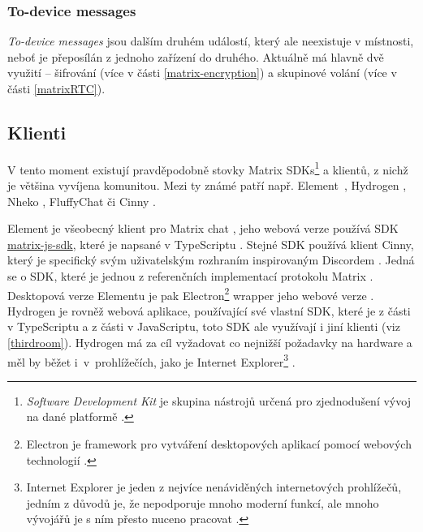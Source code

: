 \subsubsection{To-device messages}\label{toDeviceMessages}

\textit{To-device messages} jsou dalším druhém událostí, který ale neexistuje v
místnosti, neboť je přeposílán z jednoho zařízení do druhého. Aktuálně má hlavně
dvě využití -- šifrování (více v části \ref{matrix-encryption}) a skupinové
volání (více v části \ref{matrixRTC}).

\subsection{Klienti}

V tento moment existují pravděpodobně stovky Matrix SDKs\footnote{
    \textit{Software Development Kit} je skupina nástrojů určená pro zjednodušení
    vývoj na dané platformě \cite{RedHat-WhatIsAnSDK}.
} a klientů, z nichž je většina vyvíjena komunitou. Mezi ty známé patří např.
Element~\cite{Element-Homepage}, Hydrogen \cite{GitHub-Hydrogen}, Nheko
\cite{GitHub-Nheko}, FluffyChat \cite{FluffyChat-Homepage} či Cinny
\cite{Cinny-Homepage}.

Element je všeobecný klient pro Matrix chat \cite{Element-Homepage}, jeho webová
verze používá SDK
\href{https://github.com/matrix-org/matrix-js-sdk/}{matrix-js-sdk}, které je
napsané v TypeScriptu \cite{GitHub-MatrixJSSDK}. Stejné SDK používá klient
Cinny, který je specifický svým uživatelským rozhraním inspirovaným Discordem
\cite{Cinny-Homepage,GitHub-Cinny}. Jedná se o SDK, které je jednou z
referenčních implementací protokolu Matrix \cite{GitHub-MatrixJSSDK}. Desktopová
verze Elementu je pak Electron\footnote{
    Electron je framework pro vytváření desktopových aplikací pomocí webových
    technologií \cite{ElectronJS-Homepage}.
} wrapper jeho webové verze \cite{GitHub-ElementDesktop}. Hydrogen je rovněž
webová aplikace, používající své vlastní SDK, které je z části v TypeScriptu a
z části v JavaScriptu, toto SDK ale využívají i jiní klienti (viz
\ref{thirdroom}). Hydrogen má za cíl vyžadovat co nejnižší požadavky na hardware a
měl by běžet i~v~prohlížečích, jako je Internet Explorer\footnote{
    Internet Explorer je jeden z nejvíce nenáviděných internetových prohlížečů,
    jedním z důvodů je, že nepodporuje mnoho moderní funkcí, ale mnoho vývojářů je s
    ním přesto nuceno pracovat
    \cite{ZealousSites-WhyDoWebDevelopersHateInternetExplorer}.
} \cite{GitHub-Hydrogen}.

